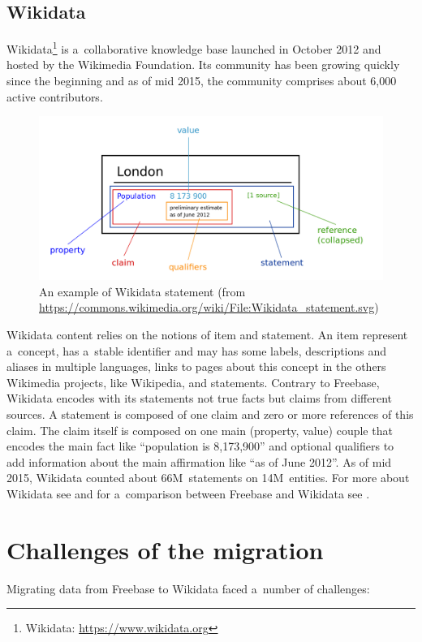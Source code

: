 \documentclass{sig-alternate}
\begin{document}
\subsection{Wikidata}

Wikidata\footnote{Wikidata: \url{https://www.wikidata.org}}
is a~collaborative knowledge base
launched in October 2012 and hosted by the Wikimedia Foundation.
Its community has been growing quickly since the beginning and as of mid 2015,
the community comprises about 6,000 active contributors.

\begin{figure}
\centering
\includegraphics[width=8.45 cm]{img/Wikidata-statement.png}
\caption{An example of Wikidata statement (from
\url{https://commons.wikimedia.org/wiki/File:Wikidata_statement.svg})}
\label{fig-statement}
\end{figure}

Wikidata content relies on the notions of item and statement.
An item represent a~concept, has a~stable identifier and may has some labels,
descriptions and aliases in multiple languages, links to pages about this concept
in the others Wikimedia projects, like Wikipedia, and statements.
Contrary to Freebase, Wikidata encodes with its statements not true facts
but claims from different sources.
A statement is composed of one claim and zero or more references of this claim.
The claim itself is composed on one main (property, value) couple that encodes
the main fact like ``population is 8,173,900'' and optional qualifiers
to add information about the main affirmation like ``as of June 2012''.
As of mid 2015, Wikidata counted about 66M~statements on 14M~entities.
For more about Wikidata see \cite{vrandevcic2014wikidata}
and for a~comparison between Freebase and Wikidata see \cite{farbercomparative}.

\section{Challenges of the migration}

Migrating data from Freebase to Wikidata faced a~number of challenges:
\end{document}
